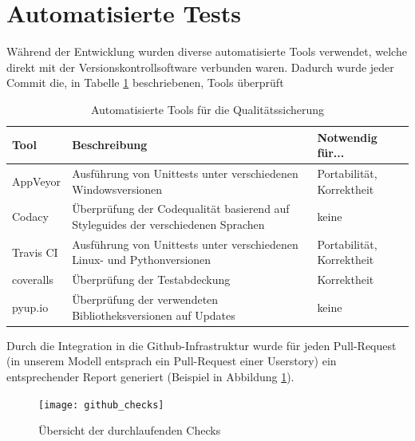 \section{Automatisierte Tests}
Während der Entwicklung wurden diverse automatisierte Tools verwendet, welche direkt mit der Versionskontrollsoftware
verbunden waren. Dadurch wurde jeder Commit die, in Tabelle \ref{qs_tools} beschriebenen, Tools überprüft
\begin{table}[H]
	\centering
	\begin{tabular}{|l|p{18em}|l|}
		\hline
		\textbf{Tool} & \textbf{Beschreibung} & \textbf{Notwendig für...} \\\hline
		AppVeyor & Ausführung von Unittests unter verschiedenen Windowsversionen & Portabilität, Korrektheit \\\hline
		Codacy & Überprüfung der Codequalität basierend auf Styleguides der verschiedenen Sprachen& keine \\\hline
		Travis CI & Ausführung von Unittests unter verschiedenen Linux- und Pythonversionen & Portabilität, Korrektheit \\\hline
		coveralls & Überprüfung der Testabdeckung & Korrektheit \\\hline
		pyup.io & Überprüfung der verwendeten Bibliotheksversionen auf Updates & keine \\\hline
	\end{tabular}
	\caption{Automatisierte Tools für die Qualitätssicherung}
	\label{qs_tools}
\end{table}

Durch die Integration in die Github-Infrastruktur wurde für jeden Pull-Request (in unserem Modell entsprach ein Pull-Request einer Userstory)
ein entsprechender Report generiert (Beispiel in Abbildung \ref{github_checks}).

\begin{figure}[h]
	\centering
	\texttt{[image: github\_checks]}
	\caption{Übersicht der durchlaufenden Checks}
	\label{github_checks}
\end{figure}

